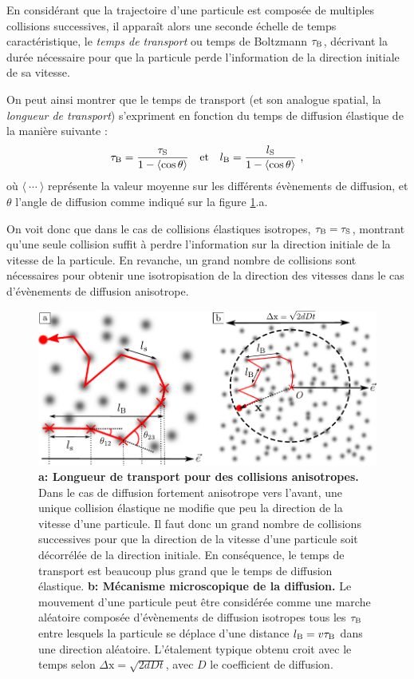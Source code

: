 En considérant que la trajectoire d'une particule est composée de multiples collisions successives, il apparaît alors une seconde échelle de temps caractéristique, le \emph{temps de transport} ou temps de Boltzmann $\tau_{\mathrm{B}}$, décrivant la durée nécessaire pour que la particule perde l'information de la direction initiale de sa vitesse. 


On peut ainsi montrer que le temps de transport (et son analogue spatial, la \emph{longueur de transport}) s'expriment en fonction du temps de diffusion élastique de la manière suivante \citep{akkermans2007mesoscopic}:
\begin{equation}
\tau_{\mathrm{B}}=\frac{\tau_{\mathrm{S}}}{1-\left\langle\cos{\theta}\right\rangle} \quad \text{et} \quad l_{\mathrm{B}}=\frac{l_{\mathrm{S}}}{1-\left\langle\cos{\theta}\right\rangle} \text{ ,}
\label{eq:definition_taub}
\end{equation}
où $\langle\:\cdots\:\rangle$ représente la valeur moyenne sur les différents évènements de diffusion, et $\theta$ l'angle de diffusion comme indiqué sur la figure \ref{fig:diffusion_classique}.a.

On voit donc que dans le cas de collisions élastiques isotropes, $\tau_{\mathrm{B}}=\tau_{\mathrm{S}}$, montrant qu'une seule collision suffit à perdre l'information sur la direction initiale de la vitesse de la particule. En revanche, un grand nombre de collisions sont nécessaires pour obtenir une isotropisation de la direction des vitesses dans le cas d'évènements de diffusion anisotrope.


\begin{figure}
\centering
\includegraphics[width=\textwidth]{Fig/Localisation/diffusion_classique.pdf}
\caption{\textbf{a: Longueur de transport pour des collisions anisotropes.} Dans le cas de diffusion fortement anisotrope vers l'avant, une unique collision élastique ne modifie que peu la direction de la vitesse d'une particule. Il faut donc un grand nombre de collisions successives pour que la direction de la vitesse d'une particule soit décorrélée de la direction initiale. En conséquence, le temps de transport est beaucoup plus grand que le temps de diffusion élastique. \textbf{b: Mécanisme microscopique de la diffusion.} Le mouvement d'une particule peut être considérée comme une marche aléatoire composée d'évènements de diffusion isotropes tous les $\tau_{\mathrm{B}}$ entre lesquels la particule se déplace d'une distance $l_{\mathrm{B}}=v \tau_{\mathrm{B}}$ dans une direction aléatoire. L'étalement typique obtenu croit avec le temps selon $\Delta \mathrm{x} =\sqrt{2dDt}$, avec $D$ le coefficient de diffusion.}
\label{fig:diffusion_classique}
\end{figure}





